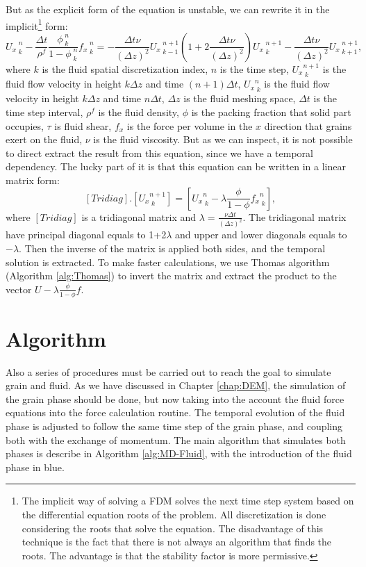     But as the explicit form of the equation is unstable, we can rewrite it in the implicit\footnote{The implicit way of solving a FDM solves the next time step system based on the differential equation roots of the problem. All discretization is done considering the roots that solve the equation. The disadvantage of this technique is the fact that there is not always an algorithm that finds the roots. The advantage is that the stability factor is more permissive.} form:
\begin{equation}
    {U_{x}}_{\;k}^{\;n} -\frac{\Delta t}{\rho^f}\frac{\phi_{\;k}^{\;n}}{1-\phi_{\;k}^{\;n}}{f_x}_{\;k}^{\;n} = -\frac{\Delta t \nu}{\left(\Delta z\right)^2}{U_{x}}_{\;k-1}^{\;n+1} (1+2\frac{\Delta t \nu}{\left(\Delta z\right)^2}){U_{x}}_{\;k}^{\;n+1} -\frac{\Delta t \nu}{\left(\Delta z\right)^2}{U_{x}}_{\;k+1}^{\;n+1},
    \label{equ:fluido_discreto_implicito}
\end{equation}
where $k$ is the fluid spatial discretization index, $n$ is the time step, ${U_x}_{\;k}^{n+1}$ is the fluid flow velocity in height $k \Delta z$ and time $(n+1)\Delta t$, ${U_x}_{\;k}^{n}$ is the fluid flow velocity in height $k \Delta z$ and time $n\Delta t$, $\Delta z$ is the fluid meshing space, $\Delta t$ is the time step interval, $\rho^f$ is the fluid density, $\phi$ is the packing fraction that solid part occupies, $\tau$ is fluid shear, $f_x$ is the force per volume in the $x$ direction that grains exert on the fluid, $\nu$ is the fluid viscosity. But as we can inspect, it is not possible to direct extract the result from this equation, since we have a temporal dependency. The lucky part of it is that this equation can be written in a linear matrix form:
\begin{equation}
    \left[Tridiag\right].\left[{U_x}_{\;k}^{n+1}\right] = \left[{U_x}_{\;k}^{n} -\lambda \frac{\phi}{1-\phi} {f_x}_{\;k}^{n}\right],
\end{equation}
where $\left[Tridiag\right]$ is a tridiagonal matrix and $\lambda = \frac{\nu \Delta t}{\left(\Delta z\right)^2}$. The tridiagonal matrix have principal diagonal equals to 1+2$\lambda$ and upper and lower diagonals equals to $-\lambda$. Then the inverse of the matrix is applied both sides, and the temporal solution is extracted. To make faster calculations, we use Thomas algorithm (Algorithm \ref{alg:Thomas}) to invert the matrix and extract the product to the vector $U-\lambda \frac{\phi}{1-\phi}f$.

\section{Algorithm}
    Also a series of procedures must be carried out to reach the goal to simulate grain and fluid. As we have discussed in Chapter \ref{chap:DEM}, the simulation of the grain phase should be done, but now taking into the account the fluid force equations into the force calculation routine. The temporal evolution of the fluid phase is adjusted to follow the same time step of the grain phase, and coupling both with the exchange of momentum. The main algorithm that simulates both phases is describe in Algorithm \ref{alg:MD-Fluid}, with the introduction of the fluid phase in blue.

